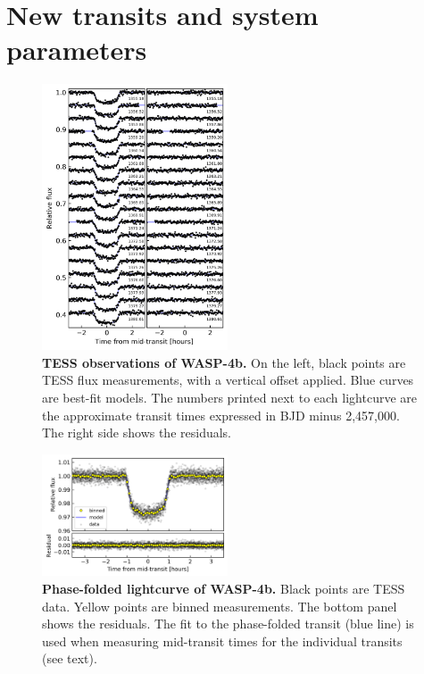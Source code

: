 \documentclass[12pt,twocolumn,tighten]{aastex62}
\begin{document}
\section{New transits and system parameters}
\label{sec:observations}

\begin{figure}[t]
    \begin{center}
        \includegraphics[width=0.49\textwidth]{f1.png}
    \end{center}
    \vspace{-0.5cm}
    \caption{
      {\bf TESS observations of WASP-4b.} On the left, black points
      are TESS flux measurements, with a vertical offset applied. Blue
      curves are best-fit models. The numbers printed next to each
      lightcurve are the approximate transit times expressed in
      BJD minus 2{,}457{,}000.  The right side shows the
      residuals.
       \label{fig:lightcurves}
    }
\end{figure}

\begin{figure}[t]
    \begin{center}
        \includegraphics[width=0.49\textwidth]{f2.png}
    \end{center}
    \vspace{-0.5cm}
    \caption{
        {\bf Phase-folded lightcurve of WASP-4b.} Black points are
        TESS data. Yellow points are binned measurements.  The bottom
        panel shows the residuals.  The fit to the phase-folded
        transit (blue line) is used when measuring mid-transit times for
        the individual transits (see text).
        \label{fig:phasefold}
    }
\end{figure}
\end{document}
